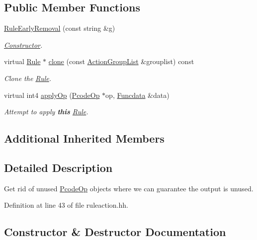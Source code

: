 \subsection*{Public Member Functions}
\begin{DoxyCompactItemize}
\item 
\mbox{\hyperlink{class_rule_early_removal_a09fefef2f911b47d9e4cc4380c8e16d8}{Rule\+Early\+Removal}} (const string \&g)
\begin{DoxyCompactList}\small\item\em \mbox{\hyperlink{class_constructor}{Constructor}}. \end{DoxyCompactList}\item 
virtual \mbox{\hyperlink{class_rule}{Rule}} $\ast$ \mbox{\hyperlink{class_rule_early_removal_a51a80e5b1a90383f7ab38dd5da1b19c0}{clone}} (const \mbox{\hyperlink{class_action_group_list}{Action\+Group\+List}} \&grouplist) const
\begin{DoxyCompactList}\small\item\em Clone the \mbox{\hyperlink{class_rule}{Rule}}. \end{DoxyCompactList}\item 
virtual int4 \mbox{\hyperlink{class_rule_early_removal_a8409f6b8ffe4ba8b6f59140b6da58d12}{apply\+Op}} (\mbox{\hyperlink{class_pcode_op}{Pcode\+Op}} $\ast$op, \mbox{\hyperlink{class_funcdata}{Funcdata}} \&data)
\begin{DoxyCompactList}\small\item\em Attempt to apply {\bfseries{this}} \mbox{\hyperlink{class_rule}{Rule}}. \end{DoxyCompactList}\end{DoxyCompactItemize}
\subsection*{Additional Inherited Members}


\subsection{Detailed Description}
Get rid of unused \mbox{\hyperlink{class_pcode_op}{Pcode\+Op}} objects where we can guarantee the output is unused. 

Definition at line 43 of file ruleaction.\+hh.



\subsection{Constructor \& Destructor Documentation}
\mbox{\label{class_rule_early_removal_a09fefef2f911b47d9e4cc4380c8e16d8}} 
